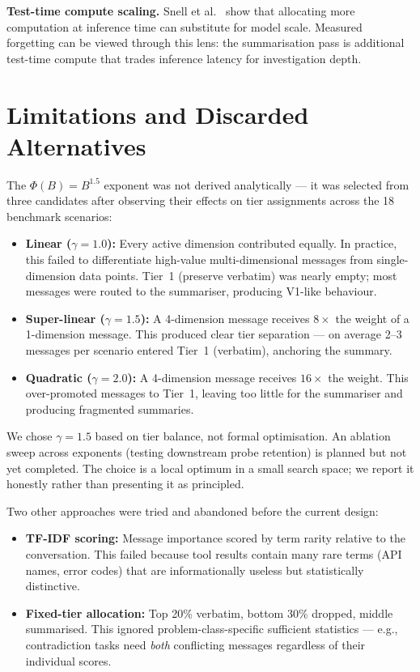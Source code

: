 \documentclass[11pt,a4paper]{article}
\begin{document}
\textbf{Test-time compute scaling.} Snell et al.\ \cite{snell2024scaling} show that allocating more computation at inference time can substitute for model scale. Measured forgetting can be viewed through this lens: the summarisation pass is additional test-time compute that trades inference latency for investigation depth.

\section{Limitations and Discarded Alternatives}

The $\Phi(B) = B^{1.5}$ exponent was not derived analytically --- it was selected from three candidates after observing their effects on tier assignments across the 18 benchmark scenarios:

\begin{itemize}[nosep]
  \item \textbf{Linear ($\gamma = 1.0$):} Every active dimension contributed equally. In practice, this failed to differentiate high-value multi-dimensional messages from single-dimension data points. Tier~1 (preserve verbatim) was nearly empty; most messages were routed to the summariser, producing V1-like behaviour.
  \item \textbf{Super-linear ($\gamma = 1.5$):} A 4-dimension message receives $8\times$ the weight of a 1-dimension message. This produced clear tier separation --- on average 2--3 messages per scenario entered Tier~1 (verbatim), anchoring the summary.
  \item \textbf{Quadratic ($\gamma = 2.0$):} A 4-dimension message receives $16\times$ the weight. This over-promoted messages to Tier~1, leaving too little for the summariser and producing fragmented summaries.
\end{itemize}

\noindent We chose $\gamma = 1.5$ based on tier balance, not formal optimisation. An ablation sweep across exponents (testing downstream probe retention) is planned but not yet completed. The choice is a local optimum in a small search space; we report it honestly rather than presenting it as principled.

Two other approaches were tried and abandoned before the current design:

\begin{itemize}[nosep]
  \item \textbf{TF-IDF scoring:} Message importance scored by term rarity relative to the conversation. This failed because tool results contain many rare terms (API names, error codes) that are informationally useless but statistically distinctive.
  \item \textbf{Fixed-tier allocation:} Top 20\% verbatim, bottom 30\% dropped, middle summarised. This ignored problem-class-specific sufficient statistics --- e.g., contradiction tasks need \emph{both} conflicting messages regardless of their individual scores.
\end{itemize}
\end{document}
